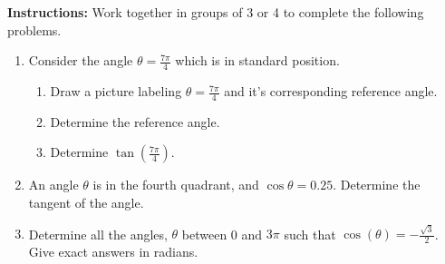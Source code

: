 


\noindent \textbf{Instructions:}  Work together in groups of  3 or 4 to complete the following problems.\\


\begin{enumerate}

\item Consider the angle $\displaystyle \theta=\frac{7\pi}{4}$ which
  is in standard position.
\begin{enumerate}
\item  Draw a picture labeling $\displaystyle \theta=\frac{7\pi}{4}$
  and it's corresponding reference angle.
  

\item Determine the reference angle.
  \vfill

\item Determine $\displaystyle \tan\left(\frac{7\pi}{4}\right)$.
  \vfill
  
\end{enumerate}


\clearpage



\item An angle $\theta$ is in the fourth quadrant, and $\cos{\theta}=0.25$.  Determine the tangent of the angle.\vfill

\item Determine all the angles, $\theta$ between 0 and $3\pi$ such that $\cos{(\theta)}=-\frac{\sqrt{3}}{2}$.  Give exact answers in radians.\vfill





\end{enumerate}
